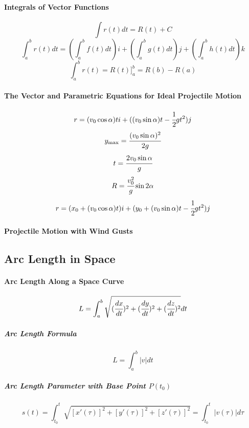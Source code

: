 \documentclass{article}
\begin{document}
            \paragraph{Integrals of Vector Functions}
                \[\int r(t)dt=R(t)+C\]
                \[\int_a^br(t)dt=(\int_a^bf(t)dt)i+(\int_a^bg(t)dt)j+(\int_a^bh(t)dt)k\]
                \[\int_a^br(t)=R(t)\Bigg]_a^b=R(b)-R(a)\]
            \paragraph{The Vector and Parametric Equations for Ideal Projectile Motion}
                \[r=(v_0\cos\alpha)ti+((v_0\sin\alpha)t-\cfrac{1}{2}gt^2)j\]
                \[y_{\text{max}}=\cfrac{(v_0\sin\alpha)^2}{2g}\]
                \[t=\cfrac{2v_0\sin\alpha}{g}\]
                \[R=\cfrac{v_0^2}{g}\sin 2\alpha\]
                \[r=(x_0+(v_0\cos\alpha)t)i+(y_0+(v_0\sin\alpha)t-\cfrac{1}{2}gt^2)j\]
            \paragraph{Projectile Motion with Wind Gusts}
        \subsection{Arc Length in Space}
            \paragraph{Arc Length Along a Space Curve}
                \[L=\int_a^b\sqrt{(\cfrac{dx}{dt})^2+(\cfrac{dy}{dt})^2+(\cfrac{dz}{dt})^2}dt\]
                \subparagraph{Arc Length Formula}
                    \[L=\int_a^b|v|dt\]
                \subparagraph{Arc Length Parameter with Base Point $P(t_0)$}
                    \[s(t)=\int_{t_0}^t\sqrt{[x'(\tau)]^2+[y'(\tau)]^2+[z'(\tau)]^2}=\int_{t_0}^t|v(\tau)|d\tau\]
\end{document}
